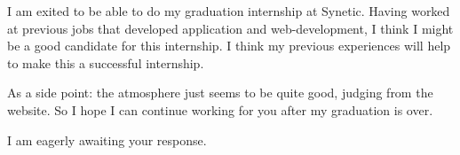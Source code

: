 \documentclass[11pt,a4paper,sans]{moderncv}        %
\begin{document}
I am exited to be able to do my graduation internship at Synetic. Having worked at previous jobs that developed application and web-development, I think I might be a good candidate for this internship. I think my previous experiences will help to make this a successful internship. 

As a side point: the atmosphere just seems to be quite good, judging from the website. So I hope I can continue working for you after my graduation is over. 

I am eagerly awaiting your response. 

\makeletterclosing

\end{document}
